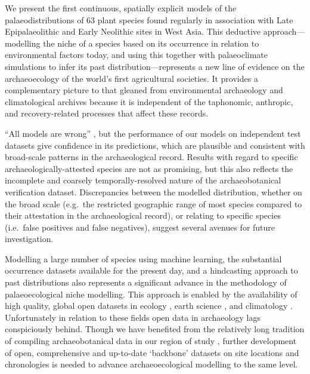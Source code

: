 \documentclass[
  authoryear,
  preprint]{elsarticle}
\begin{document}
We present the first continuous, spatially explicit models of the
palaeodistributions of 63 plant species found regularly in association
with Late Epipalaeolithic and Early Neolithic sites in West Asia. This
deductive approach---modelling the niche of a species based on its
occurrence in relation to environmental factors today, and using this
together with palaeoclimate simulations to infer its past
distribution---represents a new line of evidence on the archaeoecology
of the world's first agricultural societies. It provides a complementary
picture to that gleaned from environmental archaeology and
climatological archives because it is independent of the taphonomic,
anthropic, and recovery-related processes that affect these records.

``All models are wrong'' \citep{Box1976}, but the performance of our
models on independent test datasets give confidence in its predictions,
which are plausible and consistent with broad-scale patterns in the
archaeological record. Results with regard to specific
archaeologically-attested species are not as promising, but this also
reflects the incomplete and coarsely temporally-resolved nature of the
archaeobotanical verification dataset. Discrepancies between the
modelled distribution, whether on the broad scale (e.g.~the restricted
geographic range of most species compared to their attestation in the
archaeological record), or relating to specific species (i.e.~false
positives and false negatives), suggest several avenues for future
investigation.

Modelling a large number of species using machine learning, the
substantial occurrence datasets available for the present day, and a
hindcasting approach to past distributions also represents a significant
advance in the methodology of palaeoecological niche modelling. This
approach is enabled by the availability of high quality, global open
datasets in ecology \citep{GBIF2025, GBIFSecretariat2023}, earth science
\citep{SRTM}, and climatology \citep{KargerEtAl2017, BrownEtAl2018}.
Unfortunately in relation to these fields open data in archaeology lags
conspiciously behind. Though we have benefited from the relatively long
tradition of compiling archaeobotanical data in our region of study
\citep{ColledgeEtAl2004, ShennanConolly2007, ADEMNES, LucasFuller2018, FullerEtAl2018, WallaceEtAl2018, ORIGINS},
further development of open, comprehensive and up-to-date `backbone'
datasets on site locations and chronologies is needed to advance
archaeoecological modelling to the same level.
\end{document}
